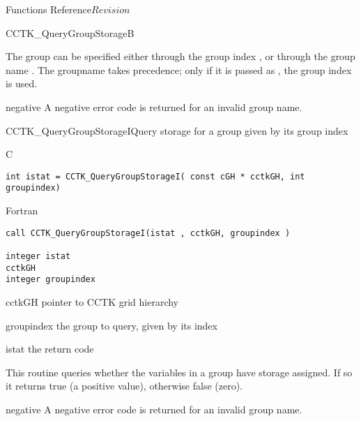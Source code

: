 \begin{cactuspart}{ Functions Reference}{}{$Revision$}
\begin{FunctionDescription}{CCTK\_QueryGroupStorageB}{}
\begin{Discussion}
The group can be specified either through the group index
, or through the group name .  The groupname
takes precedence; only if it is passed as , the group index
is used.
\end{Discussion}
\begin{ErrorSection}
\begin{Error}{negative}
A negative error code is returned for an invalid group name.
\end{Error}
\end{ErrorSection}
\end{FunctionDescription}

\begin{FunctionDescription}{CCTK\_QueryGroupStorageI}{Query storage for a group given by its group index}
\label{CCTK-QueryGroupStorageI}
\begin{SynopsisSection}
\begin{Synopsis}{C}
\begin{verbatim}int istat = CCTK_QueryGroupStorageI( const cGH * cctkGH, int groupindex)\end{verbatim}
\end{Synopsis}
\begin{Synopsis}{Fortran}
\begin{verbatim}call CCTK_QueryGroupStorageI(istat , cctkGH, groupindex )

integer istat
cctkGH
integer groupindex\end{verbatim}
\end{Synopsis}
\end{SynopsisSection}
\begin{ParameterSection}
\begin{Parameter}{cctkGH}
pointer to CCTK grid hierarchy
\end{Parameter}
\begin{Parameter}{groupindex}
the group to query, given by its index
\end{Parameter}
\begin{Parameter}{istat}
the return code
\end{Parameter}
\end{ParameterSection}
\begin{Discussion}
This routine queries whether the variables in a group have storage assigned.
If so it returns true (a positive value), otherwise false (zero).
\end{Discussion}
\begin{ErrorSection}
\begin{Error}{negative}
A negative error code is returned for an invalid group name.
\end{Error}
\end{ErrorSection}
\end{FunctionDescription}





\end{cactuspart}

